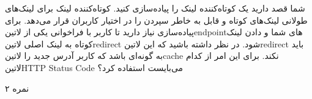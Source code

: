 
شما قصد دارید یک کوتاه‌کننده لینک را پیاده‌سازی کنید. کوتاه‌کننده لینک برای لینک‌های طولانی لینک‌های کوتاه و قابل به خاطر سپردن را در اختیار کاربران قرار می‌دهد.
برای پیاده‌سازی نیاز دارید تا کاربر با فراخوانی یکی از ‌لاتین{endpoint}های شما و دادن لینک کوتاه به لینک اصلی ‌لاتین{redirect} شود.
در نظر داشته باشید که این ‌لاتین{redirect} باید به گونه‌ای باشد که کاربر آدرس جدید را ‌لاتین{cache} نکند.
برای این امر از کدام ‌لاتین{HTTP Status Code} می‌بایست استفاده کرد؟

۲ نمره
